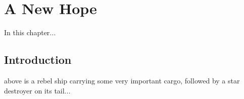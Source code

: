 
\chapter{A New Hope}
	\label{chapter:a-new-hope}



\begin{synopsis}
	In this chapter...
\end{synopsis}


\section{Introduction}

 above is a rebel ship carrying some very important cargo, followed by a star destroyer on its tail...

